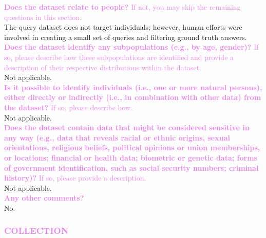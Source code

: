 \documentclass{article}
\newcommand{\sectioncolor}{Violet}
\begin{document}
    \textcolor{\sectioncolor}{\textbf{
    Does the dataset relate to people?
    }
    If not, you may skip the remaining questions in this section.
    } \\
    The query dataset does not target individuals; however, human efforts were involved in creating a small set of queries and filtering ground truth answers. \\
    
    \textcolor{\sectioncolor}{\textbf{
    Does the dataset identify any subpopulations (e.g., by age, gender)?
    }
    If so, please describe how these subpopulations are identified and
    provide a description of their respective distributions within the dataset.
    } \\
    Not applicable. \\
    
    \textcolor{\sectioncolor}{\textbf{
    Is it possible to identify individuals (i.e., one or more natural persons),
    either directly or indirectly (i.e., in combination with other data) from
    the dataset?
    }
    If so, please describe how.
    } \\
    Not applicable.  \\
    
    \textcolor{\sectioncolor}{\textbf{
    Does the dataset contain data that might be considered sensitive in any way
    (e.g., data that reveals racial or ethnic origins, sexual orientations,
    religious beliefs, political opinions or union memberships, or locations;
    financial or health data; biometric or genetic data; forms of government
    identification, such as social security numbers; criminal history)?
    }
    If so, please provide a description.
    } \\
    Not applicable. \\
    
    \textcolor{\sectioncolor}{\textbf{
    Any other comments?
    }} \\
    No. \\

\begin{mdframed}[linecolor=\sectioncolor]
\subsubsection*{\textcolor{\sectioncolor}{
    COLLECTION
}}
\end{mdframed}
\end{document}
